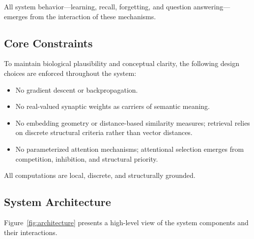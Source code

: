\documentclass[11pt]{article}
\begin{document}
All system behavior---learning, recall, forgetting, and question answering---emerges
from the interaction of these mechanisms.

\subsection{Core Constraints}

To maintain biological plausibility and conceptual clarity, the following design
choices are enforced throughout the system:

\begin{itemize}
\item No gradient descent or backpropagation.
\item No real-valued synaptic weights as carriers of semantic meaning.
\item No embedding geometry or distance-based similarity measures; retrieval relies on discrete structural criteria rather than vector distances.
\item No parameterized attention mechanisms; attentional selection emerges from competition, inhibition, and structural priority.
\end{itemize}

All computations are local, discrete, and structurally grounded.

\subsection{System Architecture}

Figure~\ref{fig:architecture} presents a high-level view of the system components and their interactions.
\end{document}
